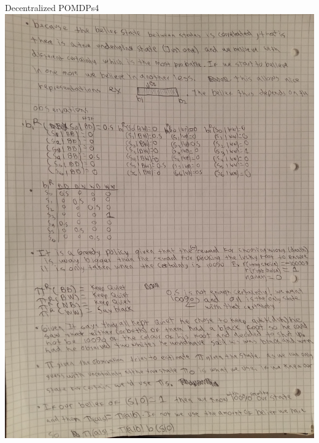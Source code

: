 \begin{questions}
\begin{question}{Decentralized POMDPs}{4}
	\includegraphics[scale=0.2]{p4.jpg}	
		\newpage


\end{question}
\end{questions}
